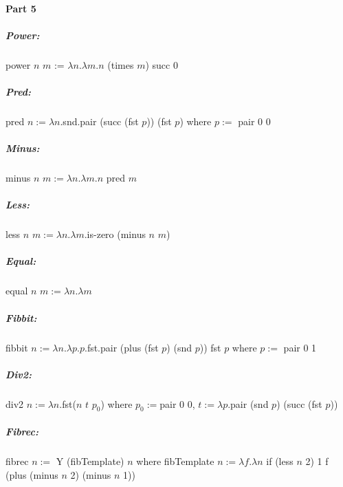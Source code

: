 \documentclass[12pt]{article}
\begin{document}
\paragraph{Part 5}
\subparagraph{Power:}
\raggedright

power $n$ $m$ := $\lambda n. \lambda m.n$ (times $m$) succ 0
\subparagraph{Pred:}
pred $n:= \lambda n$.snd.pair (succ (fst $p$)) (fst $p$) where $p := $ pair 0 0
\subparagraph{Minus:} 
minus $n$ $m := \lambda n. \lambda m.n$ pred $m$
\subparagraph{Less:}
less $n$ $m := \lambda n. \lambda m.$is-zero (minus $n$ $m$)
\subparagraph{Equal:}
equal $n$ $m := \lambda n. \lambda m$
\subparagraph{Fibbit:}
fibbit $n := \lambda n. \lambda p. p.$fst.pair (plus (fst $p$) (snd $p$)) fst $p$ where $p := $ pair 0 1
\subparagraph{Div2:}
div2 $n := \lambda n.$fst($n$ $t$ $p_{0}$) where $p_{0} := $pair 0 0, $t := \lambda p.$pair (snd $p$) (succ (fst $p$))
\subparagraph{Fibrec:}
fibrec $n :=$ Y (fibTemplate) $n$ where fibTemplate $n := \lambda f.\lambda n$ if (less $n$ 2) 1 f (plus (minus $n$ 2) (minus $n$ 1))
\enddocument
\end{document}
